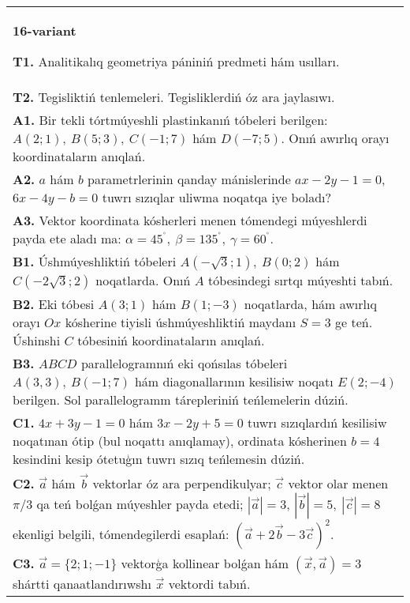 \documentclass{article}
\begin{document}
\begin{tabular}{m{17cm}}
\textbf{16-variant}

\textbf{T1.} Analitikalıq geometriya pániniń predmeti hám usılları.
 \\
\textbf{T2.} 
Tegisliktiń tenlemeleri. Tegisliklerdiń óz ara jaylasıwı.
 \\
\textbf{A1.} 
Bir tekli tórtmúyeshli plastinkanıń tóbeleri berilgen:
$A (2;1), \ B (5;3), \ C (-1;7) $ hám $D (-7;5) $. Onıń awırlıq orayı
koordinataların anıqlań.
 \\
\textbf{A2.} 
$a$ hám $b$ parametrlerinin qanday mánislerinde
$ax-2y-1=0$, $6x-4y-b=0$ tuwrı sızıqlar uliwma noqatqa iye boladı?
 \\
\textbf{A3.} 
Vektor koordinata kósherleri menen tómendegi múyeshlerdi payda ete aladı ma:
$\alpha = 45^{{^\circ}},\ \beta = 135^{{^\circ}},\ \gamma = 60^{{^\circ}}$.
 \\
\textbf{B1.} 
Úshmúyeshliktiń tóbeleri
\(A\left(-\sqrt{3};1 \right),\ B (0;2) \) hám
\(C\left(-2\sqrt{3};2 \right) \) noqatlarda. Onıń $A$
tóbesindegi sırtqı múyeshti tabıń.
 \\
\textbf{B2.} 
Eki tóbesi \(A (3;1) \) hám \(B (1;-3) \) noqatlarda, hám
awırlıq orayı $Ox$ kósherine tiyisli úshmúyeshliktiń maydanı
\(S=3\) ge teń. Úshinshi $C$ tóbesiniń koordinataların anıqlań.
 \\
\textbf{B3.} 
$ABCD$ parallelogramnıń eki qońsılas tóbeleri
\(A (3,3),\ B (-1;7) \) hám diagonallarının kesilisiw noqatı
\(E (2;-4) \) berilgen. Sol parallelogramm tárepleriniń teńlemelerin
dúziń.
 \\
\textbf{C1.} 
\(4x+3y-1=0\) hám \(3x-2y+5=0\)
tuwrı sızıqlardıń kesilisiw noqatınan ótip (bul noqattı anıqlamay), ordinata
kósherinen \(b=4\) kesindini kesip ótetuģın tuwrı sızıq teńlemesin dúziń.
 \\
\textbf{C2.} 
$\vec{a}$ hám $\vec{b}$ vektorlar óz ara perpendikulyar; $\vec{c}$ vektor olar menen $\pi/3$ qa teń bolǵan múyeshler payda etedi; $|\vec{a}| = 3$, $|\vec{b}| = 5,\ |\vec{c}| = 8$ ekenligi belgili, tómendegilerdi esaplań:
$ (\vec{a} + 2\vec{b} - 3\vec{c}) ^{2}$.
 \\
\textbf{C3.} 
$\vec{a} = \{ 2;1; - 1\}$ vektorģa kollinear bolǵan hám $\left(\vec{x},\vec{a} \right) = 3$ shártti qanaatlandırıwshı $\vec{x}$ vektordi tabıń.
 \\

\end{tabular}
\vspace{1cm}
\end{document}
